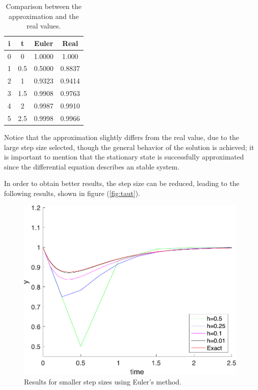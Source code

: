\begin{table}[H]
\centering
\begin{tabular}{cccc}
\hline
\textbf{i} & \textbf{t} & \textbf{Euler} & \textbf{Real} \\ \hline
0          & 0          & 1.0000         & 1.000         \\
1          & 0.5        & 0.5000         & 0.8837        \\
2          & 1          & 0.9323         & 0.9414        \\
3          & 1.5        & 0.9908         & 0.9763        \\
4          & 2          & 0.9987         & 0.9910        \\
5          & 2.5        & 0.9998         & 0.9966        \\ \hline
\end{tabular}
\caption{Comparison between the approximation and the real values.}
\label{tab:euler}
\end{table}
Notice that the approximation slightly differs from the real value, due to the large step size selected, though the general behavior of the solution is achieved; it is important to mention that the stationary state is successfully approximated since the differential equation describes an stable system.

In order to obtain better results, the step size can be reduced, leading to the following results, shown in figure (\ref{fig:taut}).

\begin{figure}[H]
    \centering
    \includegraphics[scale=0.5]{files/exampleEuler.pdf}
    \caption{Results for smaller step sizes using Euler's method.}
    \label{fig:eulerHs}
\end{figure}


